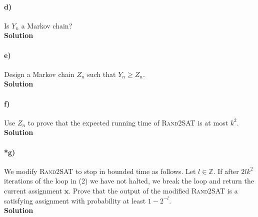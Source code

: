 \documentclass[10pt]{article}
\begin{document}
\paragraph{d)} Is $Y_n$ a Markov chain?\\
\textbf{Solution}\\

\paragraph{e)} Design a Markov chain $Z_n$ such that $Y_n\geq Z_n$.\\
\textbf{Solution}\\

\paragraph{f)} Use $Z_n$ to prove that the expected running time of \textsc{Rand2SAT} is at most $k^2$.\\
\textbf{Solution}\\

\paragraph{*g)} We modify \textsc{Rand2SAT} to stop in bounded time as follows. Let $l\in\mathbb{Z}$. If after $2lk^2$ iterations of the loop in (2) we have not halted, we break the loop and return the current assignment $\textbf{x}$. Prove that the output of the modified \textsc{Rand2SAT} is a satisfying assignment with probability at least $1-2^{-l}$.\\
\textbf{Solution}\\
\end{document}
